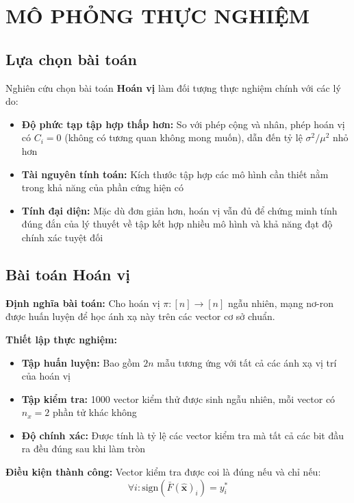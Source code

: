 \chapter{MÔ PHỎNG THỰC NGHIỆM}

\section{Lựa chọn bài toán}

Nghiên cứu chọn bài toán \textbf{Hoán vị} làm đối tượng thực nghiệm chính với các lý do:
\begin{itemize}
    \item \textbf{Độ phức tạp tập hợp thấp hơn:} So với phép cộng và nhân, phép hoán vị có $C_i = 0$ (không có tương quan không mong muốn), dẫn đến tỷ lệ $\sigma^2/\mu^2$ nhỏ hơn
    \item \textbf{Tài nguyên tính toán:} Kích thước tập hợp các mô hình cần thiết nằm trong khả năng của phần cứng hiện có
    \item \textbf{Tính đại diện:} Mặc dù đơn giản hơn, hoán vị vẫn đủ để chứng minh tính đúng đắn của lý thuyết về tập kết hợp nhiều mô hình và khả năng đạt độ chính xác tuyệt đối
\end{itemize}

\section{Bài toán Hoán vị}

\textbf{Định nghĩa bài toán:}
Cho hoán vị $\pi: [n] \rightarrow [n]$ ngẫu nhiên, mạng nơ-ron được huấn luyện để học ánh xạ này trên các vector cơ sở chuẩn.

\vspace{0.2cm}

\textbf{Thiết lập thực nghiệm:}
\begin{itemize}
    \item \textbf{Tập huấn luyện:} Bao gồm $2n$ mẫu tương ứng với tất cả các ánh xạ vị trí của hoán vị
    \item \textbf{Tập kiểm tra:} 1000 vector kiểm thử được sinh ngẫu nhiên, mỗi vector có $n_{\hat{x}} = 2$ phần tử khác không
    \item \textbf{Độ chính xác:} Được tính là tỷ lệ các vector kiểm tra mà tất cả các bit đầu ra đều đúng sau khi làm tròn
\end{itemize}

\textbf{Điều kiện thành công:}
Vector kiểm tra được coi là đúng nếu và chỉ nếu:
\begin{equation}
    \forall i: \text{sign}(\bar{F}(\hat{\mathbf{x}})_i) = y_i^*
\end{equation}

